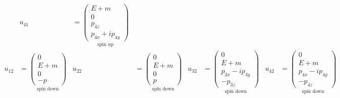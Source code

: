 \documentclass[12pt]{article}
\begin{document}
\begin{align*}
&
u_{41}&=
\underset{\text{spin up}}
{\begin{pmatrix}E+m\\0\\p_{4z}\\p_{4x}+ip_{4y}\end{pmatrix}}
\\[1ex]
u_{12}&=
\underset{\text{spin down}}
{
\begin{pmatrix}0\\E+m\\0\\-p\end{pmatrix}
}
&
u_{22}&=
\underset{\text{spin down}}
{
\begin{pmatrix}0\\E+m\\0\\p\end{pmatrix}
}
&
u_{32}&=
\underset{\text{spin down}}
{
\begin{pmatrix}0\\E+m\\p_{3x}-ip_{3y}\\-p_{3z}\end{pmatrix}
}
&
u_{42}&=
\underset{\text{spin down}}
{
\begin{pmatrix}0\\E+m\\p_{4x}-ip_{4y}\\-p_{4z}\end{pmatrix}
}
\end{align*}
\else
\end{document}

